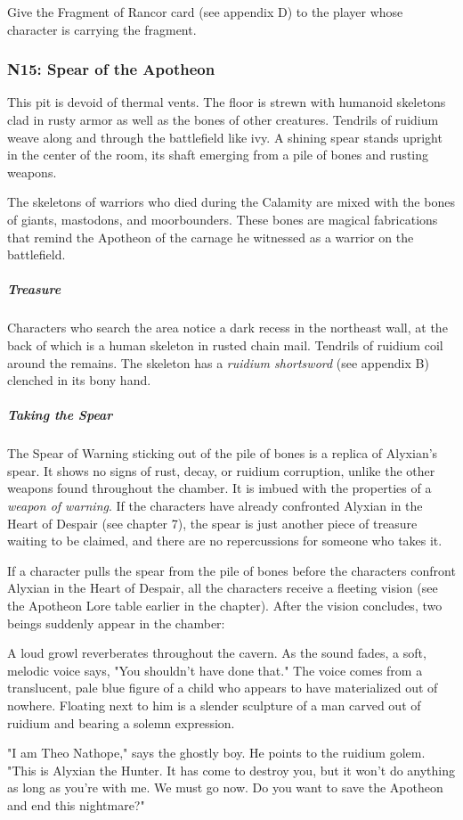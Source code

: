 \documentclass[10pt,a4paper,twoside,fancy,bg=print,twocolumn,openany,nodeprecatedcode]{dndbook}
\begin{document}
Give the Fragment of Rancor card (see appendix D) to the player whose character is carrying the fragment.

\subsubsection{N15: Spear of the Apotheon}
\begin{DndReadAloud}{}
This pit is devoid of thermal vents. The floor is strewn with humanoid skeletons clad in rusty armor as well as the bones of other creatures. Tendrils of ruidium weave along and through the battlefield like ivy. A shining spear stands upright in the center of the room, its shaft emerging from a pile of bones and rusting weapons.

\end{DndReadAloud}

The skeletons of warriors who died during the Calamity are mixed with the bones of giants, mastodons, and moorbounders. These bones are magical fabrications that remind the Apotheon of the carnage he witnessed as a warrior on the battlefield.

\subparagraph{Treasure}
Characters who search the area notice a dark recess in the northeast wall, at the back of which is a human skeleton in rusted chain mail. Tendrils of ruidium coil around the remains. The skeleton has a \textit{ruidium shortsword} (see appendix B) clenched in its bony hand.

\subparagraph{Taking the Spear}
The Spear of Warning sticking out of the pile of bones is a replica of Alyxian's spear. It shows no signs of rust, decay, or ruidium corruption, unlike the other weapons found throughout the chamber. It is imbued with the properties of a \textit{weapon of warning}. If the characters have already confronted Alyxian in the Heart of Despair (see chapter 7), the spear is just another piece of treasure waiting to be claimed, and there are no repercussions for someone who takes it.

If a character pulls the spear from the pile of bones before the characters confront Alyxian in the Heart of Despair, all the characters receive a fleeting vision (see the Apotheon Lore table earlier in the chapter). After the vision concludes, two beings suddenly appear in the chamber:

\begin{DndReadAloud}{}
A loud growl reverberates throughout the cavern. As the sound fades, a soft, melodic voice says, "You shouldn't have done that." The voice comes from a translucent, pale blue figure of a child who appears to have materialized out of nowhere. Floating next to him is a slender sculpture of a man carved out of ruidium and bearing a solemn expression.

"I am Theo Nathope," says the ghostly boy. He points to the ruidium golem. "This is Alyxian the Hunter. It has come to destroy you, but it won't do anything as long as you're with me. We must go now. Do you want to save the Apotheon and end this nightmare?"

\end{DndReadAloud}
\end{document}
